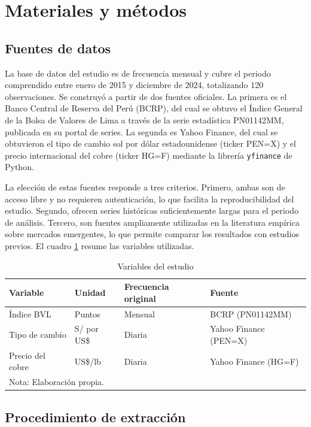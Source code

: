 \documentclass[12pt, a4paper]{article}
\begin{document}
\section{Materiales y métodos}

\subsection{Fuentes de datos}

La base de datos del estudio es de frecuencia mensual y cubre el periodo comprendido entre enero de 2015 y diciembre de 2024, totalizando 120 observaciones. Se construyó a partir de dos fuentes oficiales. La primera es el Banco Central de Reserva del Perú (BCRP), del cual se obtuvo el Índice General de la Bolsa de Valores de Lima a través de la serie estadística PN01142MM, publicada en su portal de series. La segunda es Yahoo Finance, del cual se obtuvieron el tipo de cambio sol por dólar estadounidense (ticker PEN=X) y el precio internacional del cobre (ticker HG=F) mediante la librería \texttt{yfinance} de Python.

La elección de estas fuentes responde a tres criterios. Primero, ambas son de acceso libre y no requieren autenticación, lo que facilita la reproducibilidad del estudio. Segundo, ofrecen series históricas suficientemente largas para el periodo de análisis. Tercero, son fuentes ampliamente utilizadas en la literatura empírica sobre mercados emergentes, lo que permite comparar los resultados con estudios previos. El cuadro \ref{tab:variables} resume las variables utilizadas.

\begin{table}[H]
\centering
\caption{Variables del estudio}
\label{tab:variables}
\begin{tabular}{llll}
\toprule
Variable & Unidad & Frecuencia original & Fuente \\
\midrule
Índice BVL & Puntos & Mensual & BCRP (PN01142MM) \\
Tipo de cambio & S/ por US\$ & Diaria & Yahoo Finance (PEN=X) \\
Precio del cobre & US\$/lb & Diaria & Yahoo Finance (HG=F) \\
\bottomrule
\multicolumn{4}{l}{\footnotesize Nota: Elaboración propia.} \\
\end{tabular}
\end{table}

\subsection{Procedimiento de extracción}
\end{document}
